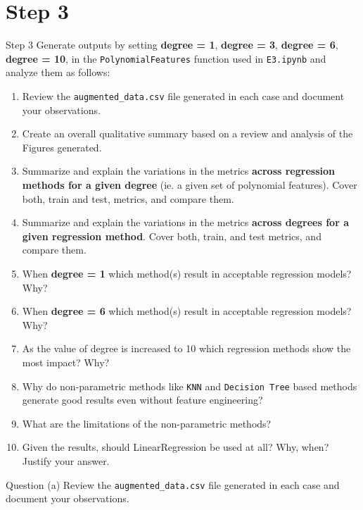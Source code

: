 \section*{Step 3}

\begin{custombox}[label={box:Q3}]{Step 3}
	Generate outputs by setting \textbf{degree = 1}, \textbf{degree = 3}, \textbf{degree = 6}, \textbf{degree = 10}, in the \verb|PolynomialFeatures| function used in \verb|E3.ipynb| and analyze them as follows:
	\begin{enumerate}[label=(\alph*)]
		\item Review the \verb|augmented_data.csv| file generated in each case and document your observations.
		\item Create an overall qualitative summary based on a review and analysis of the Figures generated.
		\item Summarize and explain the variations in the metrics \textbf{across regression methods for a given degree} (ie. a given set of polynomial features). Cover both, train and test, metrics, and compare them.
		\item Summarize and explain the variations in the metrics \textbf{across degrees for a given regression method}. Cover both, train, and test metrics, and compare them.
		\item When \textbf{degree = 1} which method(s) result in acceptable regression models? Why?
		\item When \textbf{degree = 6} which method(s) result in acceptable regression models? Why?
		\item As the value of degree is increased to 10 which regression methods show the most impact? Why?
		\item Why do non-parametric methods like \verb|KNN| and \verb|Decision Tree| based methods generate good results even without feature engineering?
		\item What are the limitations of the non-parametric methods?
		\item  Given the results, should LinearRegression be used at all? Why, when? Justify your answer.
	\end{enumerate}
\end{custombox}

\begin{customboxnew}[label={box:Q3a}]{Question (a)}
	Review the \verb|augmented_data.csv| file generated in each case and document your observations.
\end{customboxnew}

